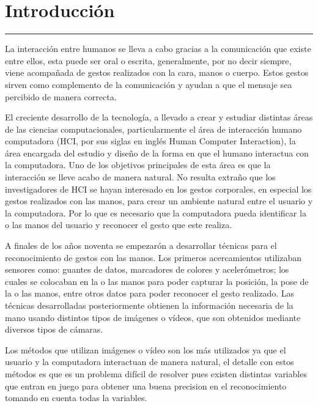 \chapter{Introducci\'on}\label{capit:cap1}
\vspace{-2.0325ex}%
\noindent
\rule{\textwidth}{0.5pt}
\vspace{-5.5ex}%
\newcommand{\pushline}{\Indp}%

La interacción entre humanos se lleva a cabo gracias a la comunicación  que existe entre ellos, esta puede ser oral o escrita, generalmente, por no decir siempre, viene acompañada de gestos realizados con la cara, manos o cuerpo. 
Estos gestos sirven como complemento de la comunicación y ayudan a que el mensaje sea percibido de manera correcta.


El creciente desarrollo de la tecnología, a llevado  a crear y estudiar distintas áreas de las ciencias computacionales, particularmente el área de interacción humano computadora (HCI, por sus siglas en ingl\'es Human Computer Interaction), la área encargada del estudio y diseño de la forma en que el humano interactua con la computadora. 
Uno de los objetivos principales de esta área es que la interacción se lleve acabo de manera natural. 
No resulta extraño que los investigadores de HCI se hayan interesado en los gestos corporales, en especial los gestos realizados con las manos, para crear un ambiente natural entre el usuario y la computadora.  
Por lo que es necesario que la computadora pueda identificar la o las manos del usuario y reconocer el gesto que este realiza. 

A finales de los años noventa se empezar\'on a desarrollar t\'ecnicas para  el reconocimiento de gestos con las manos. Los primeros acercamientos utilizaban sensores como: guantes de datos, marcadores de colores y acelerómetros; los cuales se colocaban en la o las manos para poder capturar la posición, la pose de la o las manos, entre otros datos para poder reconocer el gesto realizado. 
Las técnicas desarrolladas posteriormente obtienen la información necesaria de la mano usando distintos tipos de imágenes o vídeos, que son obtenidos mediante diversos tipos de cámaras.

Los métodos que utilizan imágenes o vídeo son los más utilizados ya que el usuario y la computadora interactuan de manera natural, el detalle con estos métodos es que es un problema difícil de resolver pues existen distintas variables que entran en juego para obtener una buena precision en el reconocimiento tomando en cuenta todas la variables. 

